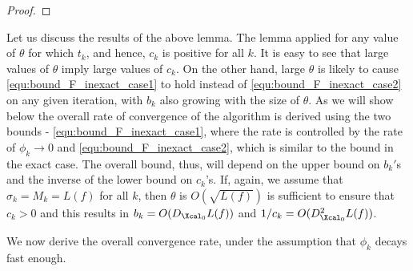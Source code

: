 \documentclass[11pt]{article}
\numberwithin{equation}{section}
\begin{document}
\begin{proof}
\end{proof}


Let us discuss the results of the above lemma. The lemma applied for any value of $\theta$ for which
$t_k$, and hence, $c_k$ is positive for all $k$.  It is easy to see that large values of  $\theta$ 
imply large values of $c_k$. On the other hand, large $\theta$ is likely to cause  \eqref{equ:bound_F_inexact_case1} to hold
instead of \eqref{equ:bound_F_inexact_case2} on any given iteration, with $b_k$ also growing with the size of $\theta$. 
As we will show below the overall rate of convergence of the algorithm is derived using the two bounds - \eqref{equ:bound_F_inexact_case1}, where
the rate is controlled by the rate of $\phi_k\to 0$ and \eqref{equ:bound_F_inexact_case2}, which is similar to the bound in the exact case.
The overall bound, thus, will depend on the upper bound on $b_k'$s and the inverse of 
the lower bound on $c_k$'s. If, again, we assume that $\sigma_k=M_k=L(f)$ for all $k$, then $\theta$ is $O(\sqrt{L(f)})$ is sufficient to ensure that $c_k>0$
and this results in $b_k=O(D_{\Xcal_0}L(f))$ and $1/c_k=O(D_{\Xcal_0}^2L(f))$. 

We now derive the overall convergence rate, under the assumption that $\phi_{k}$ decays fast enough. 
\end{document}
